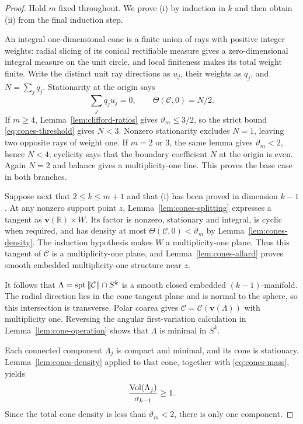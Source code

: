\begin{proof}
Hold $m$ fixed throughout.  We prove (i) by induction in $k$ and
then obtain (ii) from the final induction step.

An integral one-dimensional cone is a finite union of rays with
positive integer weights: radial slicing of its conical
rectifiable measure gives a zero-dimensional integral measure on
the unit circle, and local finiteness makes its total weight finite.
Write the distinct unit ray directions as $u_j$, their weights
as $q_j$, and $N=\sum_jq_j$.  Stationarity at the origin says
\[
 \sum_jq_ju_j=0,\qquad \Theta(\mathcal C,0)=N/2.
\]
If $m\geq4$, Lemma~\ref{lem:clifford-ratios} gives
$\vartheta_m\leq3/2$, so the strict bound
\eqref{eq:cones-threshold} gives $N<3$.
Nonzero stationarity excludes $N=1$, leaving two opposite rays of
weight one.  If $m=2$ or $3$, the same lemma gives
$\vartheta_m<2$, hence $N<4$; cyclicity says that the boundary
coefficient $N$ at the origin is even.  Again $N=2$ and balance
gives a multiplicity-one line.  This proves the base case in both
branches.

Suppose next that $2\leq k\leq m+1$ and that (i) has been proved
in dimension $k-1$.  At any nonzero support point $z$,
Lemma~\ref{lem:cones-splitting} expresses a tangent as
$\mathbf v(\mathbb R)\times W$.  Its factor is nonzero, stationary and
integral, is cyclic when required, and has density at most
$\Theta(\mathcal C,0)<\vartheta_m$ by
Lemma~\ref{lem:cones-density}.  The induction hypothesis makes
$W$ a multiplicity-one plane.  Thus this tangent of $\mathcal C$
is a multiplicity-one plane, and
Lemma~\ref{lem:cones-allard} proves smooth embedded
multiplicity-one structure near $z$.

It follows that $\Lambda=\operatorname{spt}\|\mathcal C\|\cap S^k$ is a smooth
closed embedded $(k-1)$-manifold.  The radial direction lies in
the cone tangent plane and is normal to the sphere, so this
intersection is transverse.  Polar coarea gives
$\mathcal C=\mathcal C(\mathbf v(\Lambda))$ with multiplicity one.
Reversing the angular first-variation calculation in
Lemma~\ref{lem:cone-operation} shows that $\Lambda$ is minimal
in $S^k$.

Each connected component $\Lambda_j$ is compact and minimal,
and its cone is stationary.  Lemma~\ref{lem:cones-density}
applied to that cone, together with \eqref{eq:cones-mass}, yields
\begin{equation}\label{eq:cones-component}
 \frac{\operatorname{Vol}(\Lambda_j)}{\sigma_{k-1}}\geq1.
\end{equation}
Since the total cone density is less than $\vartheta_m<2$,
there is only one component.


\end{proof}

